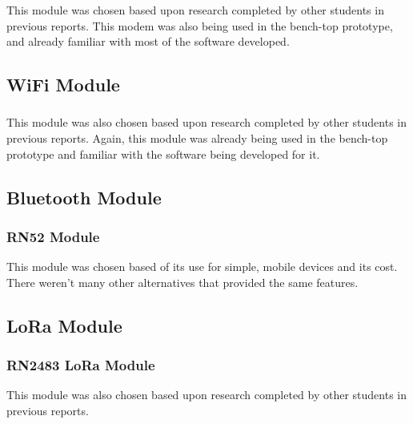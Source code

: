 	This module was chosen based upon research completed by other students in previous reports. This modem was also being used in the bench-top prototype, and already familiar with most of the software developed. 

\subsection{WiFi Module}
\subsubsection{}
		This module was also chosen based upon research completed by other students in previous reports. Again, this module was already being used in the bench-top prototype and familiar with the software being developed for it. 


\subsection{Bluetooth Module}
\subsubsection{RN52 Module}
	This module was chosen based of its use for simple, mobile devices and its cost. There weren't many other alternatives that provided the same features. 


\subsection{LoRa Module}
\subsubsection{RN2483 LoRa Module}
	This module was also chosen based upon research completed by other students in previous reports.


